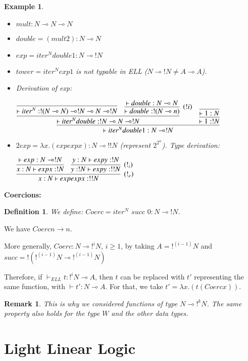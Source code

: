 \documentclass[a4paper,10pt]{article}
\newcommand{\limpl}{\multimap}  %
\newtheorem{definition}{Definition}
\newtheorem{ex}{Example}
\newtheorem{rmk}{Remark}
\begin{document}
\begin{ex}
\begin{itemize}
\item $mult: N \limpl N \limpl N$
\item $double=(mult 2): N \limpl N$
\item $exp=iter^N double 1: N \limpl !N$
\item $tower=iter^N exp 1$ is not typable in ELL ($N\limpl !N \neq A\limpl A$).
\item Derivation of exp:
\begin{center}
$	\infer{\vdash iter^N double 1: N \limpl !N}{
		\infer{\vdash iter^N double: !N \limpl N \limpl !N}{
			\infer{\vdash iter^N: !(N\limpl N) \limpl !N \limpl N \limpl !N}{}
			&
			\infer[(!i)]{\vdash double:!(N\limpl n)}{\vdash double:N\limpl N}
		}
		&
		\infer{\vdash 1:!N}{\infer{\vdash 1:N}{}}
	}$
\end{center}

\item $2exp= \lambda x.(exp exp x): N \limpl !!N$ (represent $2^{2^{n}}$). Type derivation:
\begin{center}
$	\infer[(!_e)]{x:N \vdash exp exp x: !!N}{
		\infer{x:N \vdash exp x: !N}{\vdash exp:N \limpl !N}
		&
		\infer[(!_i)]{y:!N \vdash exp y:!!N}{y:N \vdash exp y:!N}
	}$
\end{center}
\end{itemize}

\end{ex}


\vspace{0.5cm}
\textbf{Coercions:}
\begin{definition}
We define: $Coerc = iter^N$ $succ$ $0: N \limpl !N$.
\end{definition}

\par We have $Coerc n \rightarrow n$.
\par More generally, $Coerc: N \limpl !^i N$, $i\geq 1$, by taking $A=!^{(i-1)} N$ and $succ=!(!^{(i-1)} N \limpl !^{(i-1)} N)$
\par Therefore, if $\vdash_{ELL} t: !^{i} N \limpl A$, then $t$ can be replaced with $t'$ representing the same function, with $\vdash t':N \limpl A$. For that, we take $t' = \lambda x.(t (Coerc x))$.

\begin{rmk}
This is why we considered functions of type $N \limpl !^k N$. The same property also holds for the type $W$ and the other data types.
\end{rmk}




\section{Light Linear Logic}

\end{document}
